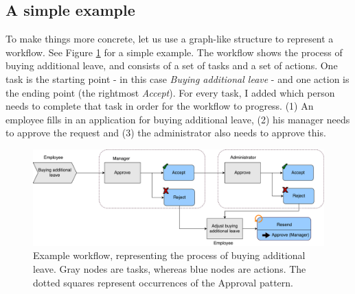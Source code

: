 \documentclass[a4paper,11pt]{article}
\begin{document}
\subsection{A simple example}
To make things more concrete, let us use a graph-like structure to represent a workflow. See Figure \ref{figure:example_workflow} for a simple example. The workflow shows the process of buying additional leave, and consists of a set of tasks and a set of actions. One task is the starting point - in this case \textit{Buying additional leave} - and one action is the ending point (the rightmost \textit{Accept}). For every task, I added which person needs to complete that task in order for the workflow to progress. (1) An employee fills in an application for buying additional leave, (2) his manager needs to approve the request and (3) the administrator also needs to approve this. 

\begin{figure}[H]
\centering
\includegraphics[width=\linewidth]{Example_Workflow.pdf}
\caption{Example workflow, representing the process of buying additional leave. Gray nodes are tasks, whereas blue nodes are actions. The dotted squares represent occurrences of the Approval pattern.}
\label{figure:example_workflow}
\end{figure}
\end{document}
